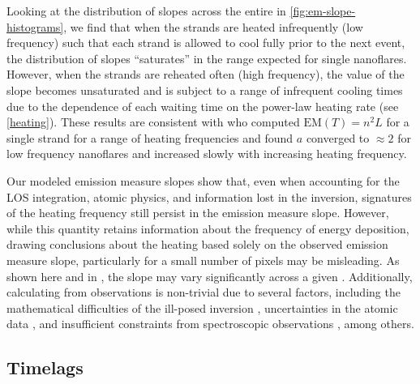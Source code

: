 Looking at the distribution of slopes across the entire \AR{} in \autoref{fig:em-slope-histograms}, we find that when the strands are heated infrequently (low frequency) such that each strand is allowed to cool fully prior to the next event, the distribution of slopes ``saturates'' in the range expected for single nanoflares. However, when the strands are reheated often (high frequency), the value of the slope becomes unsaturated and is subject to a range of infrequent cooling times due to the dependence of each waiting time on the power-law heating rate (see \autoref{heating}). These results are consistent with \citet{cargill_active_2014} who computed $\mathrm{EM}(T)=n^2L$ for a single strand for a range of heating frequencies and found $a$ converged to $\approx2$ for low frequency nanoflares and increased slowly with increasing heating frequency.

Our modeled emission measure slopes show that, even when accounting for the LOS integration, atomic physics, and information lost in the \dem{} inversion, signatures of the heating frequency still persist in the emission measure slope. However, while this quantity retains information about the frequency of energy deposition, drawing conclusions about the heating based solely on the observed emission measure slope, particularly for a small number of pixels may be misleading. As shown here and in \citet{del_zanna_evolution_2015}, the slope may vary significantly across a given \AR{}. Additionally, calculating \dem{} from observations is non-trivial due to several factors, including the mathematical difficulties of the ill-posed inversion \citep{craig_fundamental_1976,judge_failure_1995,judge_fundamental_1997}, uncertainties in the atomic data \citep{guennou_can_2013}, and insufficient constraints from spectroscopic observations \citep[e.g.][]{landi_isothermality_2010,winebarger_defining_2012}, among others.

\subsection{Timelags}\label{timelags}

